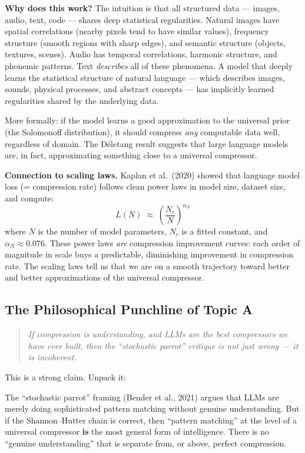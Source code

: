 \documentclass[11pt, a4paper]{article}
\begin{document}
\textbf{Why does this work?} The intuition is that all structured data ---
images, audio, text, code --- shares deep statistical regularities.
Natural images have spatial correlations (nearby pixels tend to have
similar values), frequency structure (smooth regions with sharp edges),
and semantic structure (objects, textures, scenes). Audio has temporal
correlations, harmonic structure, and phonemic patterns. Text
\emph{describes} all of these phenomena. A model that deeply learns the
statistical structure of natural language --- which describes images,
sounds, physical processes, and abstract concepts --- has implicitly
learned regularities shared by the underlying data.

More formally: if the model learns a good approximation to the universal
prior (the Solomonoff distribution), it should compress \emph{any}
computable data well, regardless of domain. The D\'{e}letang result
suggests that large language models are, in fact, approximating something
close to a universal compressor.

\textbf{Connection to scaling laws.} Kaplan et al.\ (2020) showed that
language model loss (= compression rate) follows clean power laws in
model size, dataset size, and compute:
\[
L(N) \;\approx\; \left(\frac{N_c}{N}\right)^{\!\alpha_N}
\]
where $N$ is the number of model parameters, $N_c$ is a fitted constant,
and $\alpha_N \approx 0.076$. These power laws \emph{are} compression
improvement curves: each order of magnitude in scale buys a predictable,
diminishing improvement in compression rate. The scaling laws tell us
that we are on a smooth trajectory toward better and better
approximations of the universal compressor.


\subsection{The Philosophical Punchline of Topic A}

\begin{quote}
\emph{If compression is understanding, and LLMs are the best compressors
we have ever built, then the ``stochastic parrot'' critique is not just
wrong --- it is incoherent.}
\end{quote}

This is a strong claim. Unpack it:

The ``stochastic parrot'' framing (Bender et al., 2021) argues that LLMs
are merely doing sophisticated pattern matching without genuine
understanding. But if the Shannon--Hutter chain is correct, then
``pattern matching'' at the level of a universal compressor \textbf{is}
the most general form of intelligence. There is no ``genuine
understanding'' that is separate from, or above, perfect compression.
\end{document}
